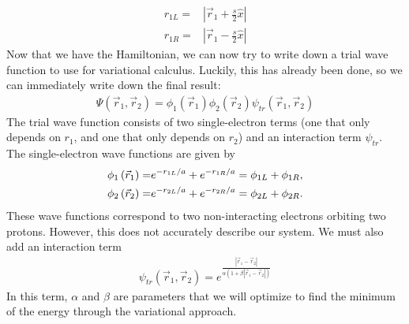 \begin{align}
{r_{1L}} =& \left| {{{\vec r}_1} + \frac{s}{2}\hat x} \right|\\{r_{1R}} =& \left| {{{\vec r}_1} - \frac{s}{2}\hat x} \right|
\end{align}
Now that we have the Hamiltonian, we can now try to write down a trial wave function to use for variational calculus. Luckily, this has already been done, so we can immediately write down the final result\cite{MSU_paper}:
\begin{align}
\Psi \left( {{{\vec r}_1},{{\vec r}_2}} \right) = {\phi _1}\left( {{{\vec r}_1}} \right){\phi _2}\left( {{{\vec r}_2}} \right)\psi_{tr} \left( {{{\vec r}_1},{{\vec r}_2}} \right)
\end{align}
The trial wave function consists of two single-electron terms (one that only depends on $r_1$, and one that only depends on $r_2$) and an interaction term $\psi_{tr}$. The single-electron wave functions are given by
\begin{align}
{\phi _1}\left( {{{\vec r}_1}} \right) =& {e^{ - {{{r_{1L}}} \mathord{\left/
 {\vphantom {{{r_{1L}}} a}} \right.
 \kern-\nulldelimiterspace} a}}} + {e^{ - {{{r_{1R}}} \mathord{\left/
 {\vphantom {{{r_{1R}}} a}} \right.
 \kern-\nulldelimiterspace} a}}} = {\phi _{1L}} + {\phi _{1R}},\\
 {\phi _2}\left( {{{\vec r}_2}} \right) =& {e^{ - {{{r_{2L}}} \mathord{\left/
 {\vphantom {{{r_{2L}}} a}} \right.
 \kern-\nulldelimiterspace} a}}} + {e^{ - {{{r_{2R}}} \mathord{\left/
 {\vphantom {{{r_{2R}}} a}} \right.
 \kern-\nulldelimiterspace} a}}} = {\phi _{2L}} + {\phi _{2R}}.
\end{align}
These wave functions correspond to two non-interacting electrons orbiting two protons. However, this does not accurately describe our system. We must also add an interaction term
\begin{align}
\psi_{tr} \left( {{{\vec r}_1},{{\vec r}_2}} \right) = {e^{\frac{{\left| {{{\vec r}_1} - {{\vec r}_2}} \right|}}{{\alpha \left( {1 + \beta \left| {{{\vec r}_1} - {{\vec r}_2}} \right|} \right)}}}}
\end{align}
In this term, $\alpha$ and $\beta$ are parameters that we will optimize to find the minimum of the energy through the variational approach.\\
\newpage
